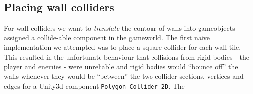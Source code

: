 \subsection{Placing wall colliders}
For wall colliders we want to \textit{translate} the contour of walls into
gameobjects assigned a collide-able component in the gameworld. The first naive
implementation we attempted was to place a square collider for each wall tile.
This resulted in the unfortunate behaviour that collisions from rigid bodies -
the player and enemies - were unreliable and rigid bodies would ``bounce off''
the walls whenever they would be ``between'' the two collider sections.
vertices and edges for a  Unity3d component \texttt{Polygon
Collider 2D}. The
